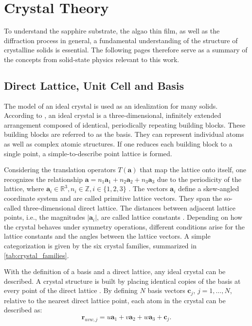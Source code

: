 \section{Crystal Theory}
To understand the sapphire substrate, the \ac{algao} thin film, as well as the diffraction
process in general, a fundamental understanding of the structure of crystalline
solids is essential. The following pages therefore serve as a summary of the concepts
from solid-state physics relevant to this work.

\subsection{Direct Lattice, Unit Cell and Basis}
The model of an ideal crystal is used as an idealization for many solids.
According to , an ideal crystal is a three-dimensional,
infinitely extended arrangement composed of identical, periodically repeating
building blocks. These building blocks are referred to as the basis. They can
represent individual atoms as well as complex atomic structures. If one reduces each
building block to a single point, a simple-to-describe point lattice is formed.

Considering the translation operators $T(\mathbf{a})$ that map the lattice onto
itself, one recognizes the relationship $\mathbf{a}= n_{1}\mathbf{a}_{1}+n_{2}\mathbf{a}
_{2}+n_{3}\mathbf{a}_{3}$ due to the periodicity of the lattice, where
$\mathbf{a}_{i}\in\mathbb{R}^{3}, n_{i}\in\mathbb{Z}, i\in \{1,2,3\}$ \autocite{Hunklinger}.
The vectors $\mathbf{a}_{i}$ define a skew-angled coordinate system and are
called primitive lattice vectors. They span the so-called three-dimensional direct
lattice. The distances between adjacent lattice points, i.e., the magnitudes $\lvert
\mathbf{a}_{i}\rvert$, are called lattice constants \autocite{Ashcroft}.
Depending on how the crystal behaves under symmetry operations, different conditions
arise for the lattice constants and the angles between the lattice vectors. A
simple categorization is given by the six crystal families, summarized in \cref{tab:crystal_families}.

With the definition of a basis and a direct lattice, any ideal crystal can be
described. A crystal structure is built by placing identical copies of the basis at
every point of the direct lattice \autocite{Ashcroft}. By defining $N$ basis vectors
$\mathbf{c}_{j}$, $j=1, \dots, N$, relative to the nearest direct lattice point,
each atom in the crystal can be described as:
\begin{equation}
	\mathbf{r}_{uvw, j}= u \mathbf{a}_{1}+ v \mathbf{a}_{2}+ w \mathbf{a}_{3}+ \mathbf{c}
	_{j}.
\end{equation}

